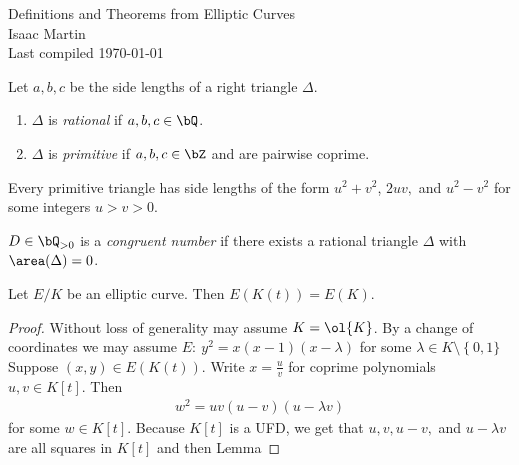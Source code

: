 


\pagestyle{empty}
	\LARGE
\begin{center}
	Definitions and Theorems from Elliptic Curves\\
	\Large
	Isaac Martin \\
    Last compiled \today
\end{center}
\normalsize
\vspace{-2mm}
\hru

\begin{homework}[e]	
	\begin{defn}\label{defn:triangle-definitions}
		Let $a,b,c$ be the side lengths of a right triangle $\Delta$.
		\begin{enumerate}
			\item $\Delta$ is \emph{rational} if $a,b,c \in \bQ$.
			\item $\Delta$ is \emph{primitive} if $a,b,c \in \bZ$ and are pairwise coprime.
		\end{enumerate}
	\end{defn}

	\begin{lem}[Lemma 1.1]\label{lem:form-for-prim-triangles}
		Every primitive triangle has side lengths of the form $u^2+v^2$, $2uv,$ and $u^2 - v^2$ for some integers $u > v > 0$.
	\end{lem}
	\begin{defn}\label{defn:congruent-number}
		$D\in \bQ_{>0}$ is a \emph{congruent number} if there exists a rational triangle $\Delta$ with $\area(\Delta) = 0$. 
	\end{defn}
\end{homework}
\begin{homework}[e]
	\begin{cor}[1.6 in Lecture]\label{cor:points-on-E-same-for-K-and-functions-on-K}
		Let $E/K$ be an elliptic curve. Then $E(K(t)) = E(K)$.
	\end{cor}
	\begin{proof}
		Without loss of generality may assume $K = \ol{K}$. By a change of coordinates we may assume $E: ~ y^{2}=x(x-1)(x-\lambda)$ for some $\lambda \in K\setminus \left\{0,1\}\right.$ Suppose $(x,y) \in E(K(t))$. Write $x = \frac{u}{v}$ for coprime polynomials $u,v \in K[t]$. Then
		 \begin{align*}
			w^{2} = uv(u - v)(u - \lambda v)
		\end{align*}
		for some $w \in K[t]$. Because $K[t]$ is a UFD, we get that $u,v,u-v,$ and $u - \lambda v$ are all squares in $K[t]$ and then Lemma
	\end{proof}
\end{homework}

